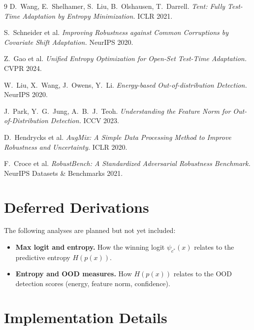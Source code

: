 \documentclass[11pt]{article}
\begin{document}
\begin{thebibliography}{9}
\small
{} D.\ Wang, E.\ Shelhamer, S.\ Liu, B.\ Olshausen, T.\ Darrell.
\emph{Tent: Fully Test-Time Adaptation by Entropy Minimization.} ICLR 2021.

 S.\ Schneider et al.
\emph{Improving Robustness against Common Corruptions by Covariate Shift
Adaptation.} NeurIPS 2020.

 Z.\ Gao et al.
\emph{Unified Entropy Optimization for Open-Set Test-Time Adaptation.}
CVPR 2024.

 W.\ Liu, X.\ Wang, J.\ Owens, Y.\ Li.
\emph{Energy-based Out-of-distribution Detection.} NeurIPS 2020.

 J.\ Park, Y.\ G.\ Jung, A.\ B.\ J.\ Teoh.
\emph{Understanding the Feature Norm for Out-of-Distribution Detection.}
ICCV 2023.

 D.\ Hendrycks et al.
\emph{AugMix: A Simple Data Processing Method to Improve Robustness and
Uncertainty.} ICLR 2020.

 F.\ Croce et al.
\emph{RobustBench: A Standardized Adversarial Robustness Benchmark.}
NeurIPS Datasets \& Benchmarks 2021.
\end{thebibliography}

\appendix

\section{Deferred Derivations}\label{app:theory}
The following analyses are planned but not yet included:
\begin{itemize}\itemsep2pt
  \item \textbf{Max logit and entropy.} How the winning logit
  $\psi_{c^*}(x)$ relates to the predictive entropy $H(p(x))$.
  \item \textbf{Entropy and OOD measures.} How $H(p(x))$ relates to the OOD
  detection scores (energy, feature norm, confidence).
\end{itemize}

\section{Implementation Details}\label{app:impl}
\end{document}
